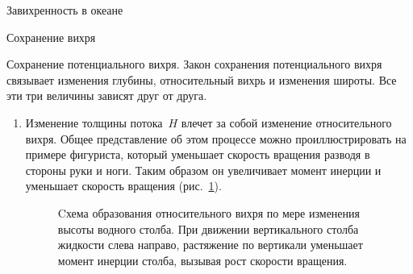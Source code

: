 \begin{chapter}{Завихренность в океане}
\begin{section}{Сохранение вихря}
\begin{paragraph}{Сохранение потенциального вихря.}
%
Закон сохранения потенциального вихря связывает изменения глубины,
относительный вихрь и изменения широты. Все эти три величины зависят друг
от друга.
%
\begin{enumerate}
\item
Изменение толщины потока~$H$ влечет за собой изменение относительного вихря.
Общее представление об этом процессе можно
проиллюстрировать на примере фигуриста, который уменьшает скорость
вращения разводя в стороны руки и ноги. Таким образом он
увеличивает момент инерции и уменьшает скорость вращения 
(рис.~\ref{fig:spinsketch}).
%
%
\begin{figure}[h!]
\caption{Cхема образования относительного вихря по мере изменения
высоты водного столба. При движении вертикального столба жидкости
слева направо, растяжение по вертикали уменьшает момент инерции
столба, вызывая рост скорости вращения.}
\label{fig:spinsketch}
\end{figure}
%


\end{enumerate}
\end{paragraph}
\end{section}
\end{chapter}
